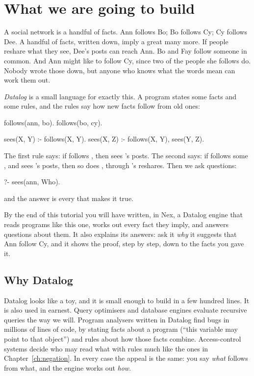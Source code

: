 \chapter{What we are going to build}\label{ch:intro}

A social network is a handful of facts. Ann follows Bo; Bo follows Cy; Cy
follows Dee. A handful of facts, written down, imply a great many more. If
people reshare what they see, Dee's posts can reach Ann. Bo and Fay follow
someone in common. And Ann might like to follow Cy, since two of the people
she follows do. Nobody wrote those down, but anyone who knows what the
words mean can work them out.

\emph{Datalog} is a small language for exactly this. A program states some
facts and some rules, and the rules say how new facts follow from old ones:

\begin{shell}
follows(ann, bo).
follows(bo, cy).

sees(X, Y) :- follows(X, Y).
sees(X, Z) :- follows(X, Y), sees(Y, Z).
\end{shell}

The first rule says: if  follows , then  sees
's posts. The second says: if  follows some , and
 sees 's posts, then so does , through 's
reshares. Then we ask questions:

\begin{shell}
?- sees(ann, Who).
\end{shell}

and the answer is every  that makes it true.

By the end of this tutorial you will have written, in Nex, a Datalog engine
that reads programs like this one, works out every fact they imply, and
answers questions about them. It also explains its answers: ask it
\emph{why} it suggests that Ann follow Cy, and it shows the proof, step by
step, down to the facts you gave it.


\section{Why Datalog}

Datalog looks like a toy, and it is small enough to build in a few hundred
lines. It is also used in earnest. Query optimisers and database engines
evaluate recursive queries the way we will. Program analysers written in
Datalog find bugs in millions of lines of code, by stating facts about a
program (``this variable may point to that object'') and rules about how
those facts combine. Access-control systems decide who may read what with
rules much like the ones in Chapter~\ref{ch:negation}. In every case the
appeal is the same: you say \emph{what} follows from what, and the engine
works out \emph{how}.

